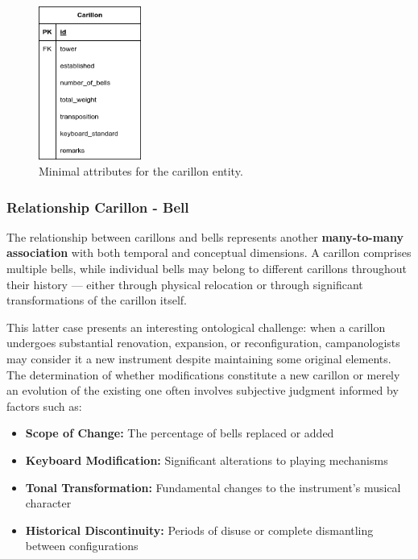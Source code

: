 \documentclass[11pt, a4paper]{article}
\begin{document}
\begin{figure}[h!]
    \centering
    \includegraphics[width=0.3\textwidth]{images/carillon.png}
    \caption{Minimal attributes for the carillon entity.}
    \label{fig:carillon-entity}
\end{figure}

\subsubsection{Relationship Carillon - Bell}

The relationship between carillons and bells represents another \textbf{many-to-many association} with both temporal and conceptual dimensions. A carillon comprises multiple bells, while individual bells may belong to different carillons throughout their history — either through physical relocation or through significant transformations of the carillon itself. 

This latter case presents an interesting ontological challenge: when a carillon undergoes substantial renovation, expansion, or reconfiguration, campanologists may consider it a new instrument despite maintaining some original elements. The determination of whether modifications constitute a new carillon or merely an evolution of the existing one often involves subjective judgment informed by factors such as:

\begin{itemize}
    \item \textbf{Scope of Change:} The percentage of bells replaced or added
    \item \textbf{Keyboard Modification:} Significant alterations to playing mechanisms
    \item \textbf{Tonal Transformation:} Fundamental changes to the instrument's musical character
    \item \textbf{Historical Discontinuity:} Periods of disuse or complete dismantling between configurations
\end{itemize}
\end{document}
